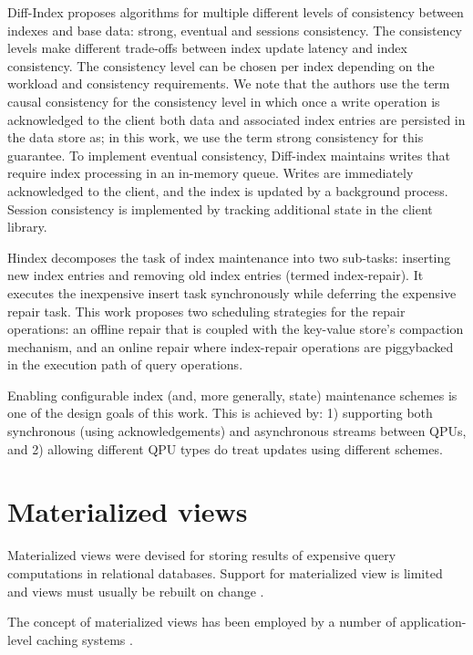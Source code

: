 Diff-Index \cite{tan:diffindex} proposes algorithms for multiple different levels of consistency between indexes and base data:
strong, eventual and sessions consistency.
The consistency levels make different trade-offs between index update latency and index consistency.
The consistency level can be chosen per index depending on the workload and consistency requirements.
We note that the authors use the term causal consistency for the consistency level in which once a write operation is
acknowledged to the client both data and associated index entries are persisted in the data store as;
in this work, we use the term strong consistency for this guarantee.
To implement eventual consistency, Diff-index maintains writes that require index processing in an in-memory queue.
Writes are immediately acknowledged to the client, and the index is updated by a background process.
Session consistency is implemented by tracking additional state in the client library.

Hindex \cite{tang:deferredindexing} decomposes the task of index maintenance into two sub-tasks:
inserting new index entries and removing old index entries (termed index-repair).
It executes the inexpensive insert task synchronously while deferring the expensive repair task.
This work proposes two scheduling strategies for the repair operations:
an offline repair that is coupled with the key-value store’s compaction mechanism,
and an online repair where index-repair operations are piggybacked in the execution path of query operations.

\bigskip
\noindent

Enabling configurable index (and, more generally, state) maintenance schemes is one of the design goals of this work.
This is achieved by: 1) supporting both synchronous (using acknowledgements) and asynchronous streams between QPUs,
and 2) allowing different QPU types do treat updates using different schemes.


\section{Materialized views}
\label{sec:mv}
Materialized views were devised for storing results of expensive query computations in relational databases.
Support for materialized view is limited \cite{mysql:mvs} and views must usually be rebuilt on change \cite{postgresql:mvs}.

The concept of materialized views has been employed by a number of application-level caching systems
\cite{kate:pequod, amiri:dbproxy, gjengset:noria}.

